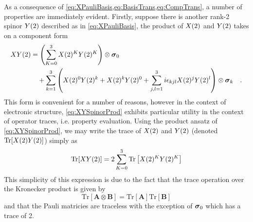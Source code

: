 As a consequence of \cref{eq:XPauliBasis,eq:BasisTrans,eq:CompTrans}, a number of properties are immediately evident. Firstly,
suppose there is another rank-2 spinor $\spinor{2}{Y}$ described as in \cref{eq:XPauliBasis}, the product of $\spinor{2}{X}$ and 
$\spinor{2}{Y}$ takes on a component form
\begin{align}
\label{eq:XYSpinorProd}
\spinor{2}{XY} &= \left(\sum_{K = 0 }^3 \spinor{2}{X}^K \spinor{2}{Y}^K\right) \otimes \pauli{0}   \nonumber \\
&\quad  + \sum_{k = 1}^3 \left( \spinor{2}{X}^0 \spinor{2}{Y}^k + \spinor{2}{X}^k \spinor{2}{Y}^0 + \sum_{j,l = 1}^3 i\epsilon_{kjl}\spinor{2}{X}^j \spinor{2}{Y}^l \right) 
    \otimes \pauli{k}
    \quad.
\end{align}
This form is convenient for a number of reasons, however in the context of electronic structure, \cref{eq:XYSpinorProd} exhibits particular utility in the
context of operator traces, i.e. property evaluation. Using the product ansatz of \cref{eq:XYSpinorProd}, we may write the trace of $\spinor{2}{X}$ and
$\spinor{2}{Y}$ (denoted $\mathrm{Tr}[\spinor{2}{X}\spinor{2}{Y}]$) simply as
\begin{equation}
\mathrm{Tr}[\spinor{2}{XY}] = 2\sum_{K = 0}^3 \mathrm{Tr}\left[\spinor{2}{X}^K\spinor{2}{Y}^K\right]
\end{equation}
This simplicity of this expression is due to the fact that the trace operation over the Kronecker product is given by
\begin{equation}
\mathrm{Tr}[\mathbf{A} \otimes \mathbf{B}] = \mathrm{Tr}[\mathbf{A}]\mathrm{Tr}[\mathbf{B}]
\end{equation}
and that the Pauli matricies are traceless with the exception of $\pauli{0}$ which has a trace of 2.

